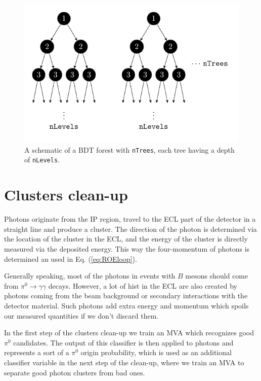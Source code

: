 \documentclass[oneside,a4paper,openany,12pt]{scrbook}
\begin{document}
\begin{figure}[H]
\centering
\captionsetup{width=0.8\linewidth}
\includegraphics[scale=1]{texfig/BDT_forest}
\caption{A schematic of a BDT forest with \texttt{nTrees}, each tree having a depth of \texttt{nLevels}.}
\label{fig:BDT}
\end{figure}

\section{Clusters clean-up}

Photons originate from the IP region, travel to the ECL part of the detector in a straight line and produce a cluster. The direction of the photon is determined via the location of the cluster in the ECL, and the energy of the cluster is directly measured via the deposited energy. This way the four-momentum of photons is determined an used in Eq. (\ref{eq:ROEloop}).

Generally speaking, most of the photons in events with $B$ mesons should come from $\pi^0 \to \gamma \gamma$ decays. However, a lot of hist in the ECL are also created by photons coming from the beam background or secondary interactions with the detector material. Such photons add extra energy and momentum which spoils our measured quantities if we don't discard them.

In the first step of the clusters clean-up we train an MVA which recognizes good $\pi^0$ candidates. The output of this classifier is then applied to photons and represents a sort of a $\pi^0$ origin probability, which is used as an additional classifier variable in the next step of the clean-up, where we train an MVA to separate good photon clusters from bad ones.
\end{document}

